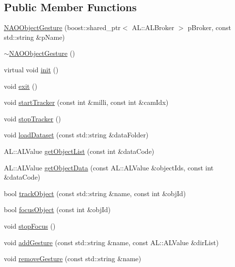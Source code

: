 \subsection*{\-Public \-Member \-Functions}
\begin{DoxyCompactItemize}
\item 
\hyperlink{classNAOObjectGesture_a7160c62b2868ea3cc1459a188e5130a8}{\-N\-A\-O\-Object\-Gesture} (boost\-::shared\-\_\-ptr$<$ \-A\-L\-::\-A\-L\-Broker $>$ p\-Broker, const std\-::string \&p\-Name)
\item 
\hyperlink{classNAOObjectGesture_afda6bd041c7f9b32940db085875cff5c}{$\sim$\-N\-A\-O\-Object\-Gesture} ()
\item 
virtual void \hyperlink{classNAOObjectGesture_af20fb7b73b00df0763522ee8ecfb2d82}{init} ()
\item 
void \hyperlink{classNAOObjectGesture_a938a55da2c887cb415c13b06b5ea77d9}{exit} ()
\item 
void \hyperlink{classNAOObjectGesture_a6177da67488eb2e9de50260f10b315cf}{start\-Tracker} (const int \&milli, const int \&cam\-Idx)
\item 
void \hyperlink{classNAOObjectGesture_ad69c7cf7867833943e0ec64688c740a1}{stop\-Tracker} ()
\item 
void \hyperlink{classNAOObjectGesture_af847ccebd8b6f27682b4dcb56f015034}{load\-Dataset} (const std\-::string \&data\-Folder)
\item 
\-A\-L\-::\-A\-L\-Value \hyperlink{classNAOObjectGesture_a0d344fcf7726a6c52edadbfbff6c3274}{get\-Object\-List} (const int \&data\-Code)
\item 
\-A\-L\-::\-A\-L\-Value \hyperlink{classNAOObjectGesture_af3b6fb604b25e8184f4052b0ace6bcd1}{get\-Object\-Data} (const \-A\-L\-::\-A\-L\-Value \&object\-Ids, const int \&data\-Code)
\item 
bool \hyperlink{classNAOObjectGesture_afad1c86748f8f96f0666221807147d41}{track\-Object} (const std\-::string \&name, const int \&obj\-Id)
\item 
bool \hyperlink{classNAOObjectGesture_aba04886e3cabbdc534fd87f91b4afe2e}{focus\-Object} (const int \&obj\-Id)
\item 
void \hyperlink{classNAOObjectGesture_ac69cf29efab0bd8fed93e8326bd745b3}{stop\-Focus} ()
\item 
void \hyperlink{classNAOObjectGesture_a962b107853f1a96ed9d1acd09c99dcdc}{add\-Gesture} (const std\-::string \&name, const \-A\-L\-::\-A\-L\-Value \&dir\-List)
\item 
void \hyperlink{classNAOObjectGesture_a8dab51061ff97c9d2bf44fd8512e2c66}{remove\-Gesture} (const std\-::string \&name)

\end{DoxyCompactItemize}
